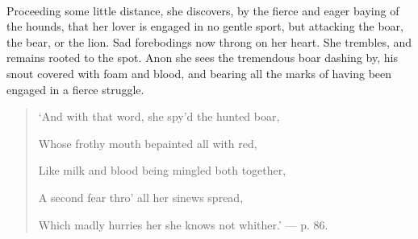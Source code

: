 \documentclass[a4paper, 11pt, oneside, polutonikogreek, english]{article}
\begin{document}
\paragraph{}
Proceeding some little distance, she discovers, by the fierce and eager baying of the hounds, that her lover is engaged in no gentle sport, but attacking the boar, the bear, or the lion. Sad forebodings now throng on her heart. She trembles, and remains rooted to the spot. Anon she sees the tremendous boar dashing by, his snout covered with foam and blood, and bearing all the marks of having been engaged in a fierce struggle.
\begin{quotation}
`And with that word, she spy'd the hunted boar,

Whose frothy mouth bepainted all with red,

Like milk and blood being mingled both together,

A second fear thro' all her sinews spread,

Which madly hurries her she knows not whither.' --- p. 86.
\end{quotation}
\end{document}
